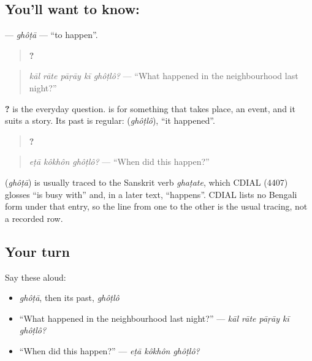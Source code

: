 \subsection*{You'll want to know: }
\textbf{} — \emph{ghôṭā} — \textquotedblleft{}to happen\textquotedblright{}.

\begin{quote}
\textbf{    ?}
\end{quote}

\begin{quote}
\emph{kāl rāte pāṛāy kī ghôṭlô?} — \textquotedblleft{}What happened in the neighbourhood last night?\textquotedblright{}
\end{quote}

\textbf{ ?} is the everyday question. \textbf{} is for something that takes place, an event, and it suits a story. Its past is regular: \textbf{} (\emph{ghôṭlô}), \textquotedblleft{}it happened\textquotedblright{}.

\begin{quote}
\textbf{  ?}
\end{quote}

\begin{quote}
\emph{eṭā kôkhôn ghôṭlô?} — \textquotedblleft{}When did this happen?\textquotedblright{}
\end{quote}

\begin{cousinweb}
\textbf{} (\emph{ghôṭā}) is usually traced to the Sanskrit verb \emph{ghaṭate}, which CDIAL (4407) glosses \textquotedblleft{}is busy with\textquotedblright{} and, in a later text, \textquotedblleft{}happens\textquotedblright{}. CDIAL lists no Bengali form under that entry, so the line from one to the other is the usual tracing, not a recorded row.
\end{cousinweb}

\subsection*{Your turn}
Say these aloud:

\begin{itemize}
\raggedright
  \item \emph{ghôṭā}, then its past, \emph{ghôṭlô}
  \item \textquotedblleft{}What happened in the neighbourhood last night?\textquotedblright{} — \emph{kāl rāte pāṛāy kī ghôṭlô?}
  \item \textquotedblleft{}When did this happen?\textquotedblright{} — \emph{eṭā kôkhôn ghôṭlô?}
\end{itemize}

